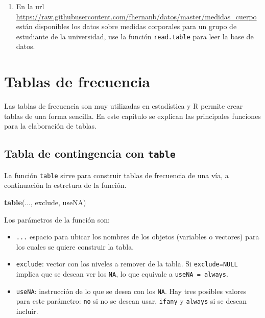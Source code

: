 \documentclass[10pt,]{krantz}
\makeatletter
\newenvironment{Shaded}{\begin{snugshade}}{\end{snugshade}}
\newcommand{\KeywordTok}[1]{\textcolor[rgb]{0.13,0.29,0.53}{\textbf{{#1}}}}
\newcommand{\NormalTok}[1]{{#1}}
\providecommand{\tightlist}{%
  \setlength{\itemsep}{0pt}\setlength{\parskip}{0pt}}
\let\proglang=\textsf
\newenvironment{kframe}{%
\medskip{}
\setlength{\fboxsep}{.8em}
 \def\at@end@of@kframe{}%
 \ifinner\ifhmode%
  \def\at@end@of@kframe{\end{minipage}}%
  \begin{minipage}{\columnwidth}%
 \fi\fi%
 \def\FrameCommand##1{\hskip\@totalleftmargin \hskip-\fboxsep
 \colorbox{shadecolor}{##1}\hskip-\fboxsep
     \hskip-\linewidth \hskip-\@totalleftmargin \hskip\columnwidth}%
 \MakeFramed {\advance\hsize-\width
   \@totalleftmargin\z@ \linewidth\hsize
   \@setminipage}}%
 {\par\unskip\endMakeFramed%
 \at@end@of@kframe}
\renewenvironment{Shaded}{\begin{kframe}}{\end{kframe}}
\makeatother
\begin{document}
\begin{enumerate}
\def\labelenumi{\arabic{enumi}.}
\setcounter{enumi}{1}
\tightlist
\item
  En la url
  \url{https://raw.githubusercontent.com/fhernanb/datos/master/medidas_cuerpo}
  están disponibles los datos sobre medidas corporales para un grupo de
  estudiante de la universidad, use la función \texttt{read.table} para
  leer la base de datos.
\end{enumerate}

\chapter{\texorpdfstring{Tablas de frecuencia
\label{tablas}}{Tablas de frecuencia  }}\label{tablas-de-frecuencia}

Las tablas de frecuencia son muy utilizadas en estadística y
\proglang{R} permite crear tablas de una forma sencilla. En este
capítulo se explican las principales funciones para la elaboración de
tablas.

\section{\texorpdfstring{Tabla de contingencia con \texttt{table}
}{Tabla de contingencia con table }}\label{tabla-de-contingencia-con-table}

La función \texttt{table} sirve para construir tablas de frecuencia de
una vía, a continuación la estrctura de la función.

\begin{Shaded}
\begin{Highlighting}[]
\KeywordTok{table}\NormalTok{(..., exclude, useNA)}
\end{Highlighting}
\end{Shaded}

Los parámetros de la función son:

\begin{itemize}
\tightlist
\item
  \texttt{...} espacio para ubicar los nombres de los objetos (variables
  o vectores) para los cuales se quiere construir la tabla.
\item
  \texttt{exclude}: vector con los niveles a remover de la tabla. Si
  \texttt{exclude=NULL} implica que se desean ver los \texttt{NA}, lo
  que equivale a
  \texttt{useNA\ =\ \textquotesingle{}always\textquotesingle{}}.
\item
  \texttt{useNA}: instrucción de lo que se desea con los \texttt{NA}.
  Hay tres posibles valores para este parámetro:
  \texttt{\textquotesingle{}no\textquotesingle{}} si no se desean usar,
  \texttt{\textquotesingle{}ifany\textquotesingle{}} y
  \texttt{\textquotesingle{}always\textquotesingle{}} si se desean
  incluir.
\end{itemize}
\end{document}
